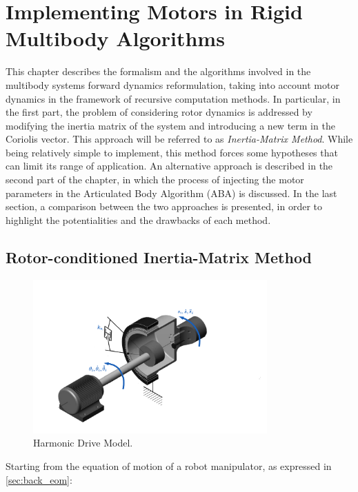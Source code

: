 \chapter{Implementing Motors in Rigid Multibody Algorithms}
\label{chp:contrib_ABA}

This chapter describes the formalism and the algorithms involved in the multibody systems forward dynamics reformulation, taking into account motor dynamics in the framework of recursive computation methods. In particular, in the first part, the problem of considering rotor dynamics is addressed by modifying the inertia matrix of the system and introducing a new term in the Coriolis vector. This approach will be referred to as \textit{Inertia-Matrix Method}. While being relatively simple to implement, this method forces some hypotheses that can limit its range of application. An alternative approach is described in the second part of the chapter, in which the process of injecting the motor parameters in the Articulated Body Algorithm (\ac{ABA}) is discussed. In the last section, a comparison between the two approaches is presented, in order to highlight the potentialities and the drawbacks of each method.

\section{Rotor-conditioned Inertia-Matrix Method}

\begin{figure}
    \centering
    \caption{Harmonic Drive Model.}
    \label{fig:harmonic_drive}
    \includegraphics[width=0.8\textwidth]{Images/harmonic_drive.png}
\end{figure}

Starting from the equation of motion of a robot manipulator, as expressed in \cref{sec:back_eom}:

